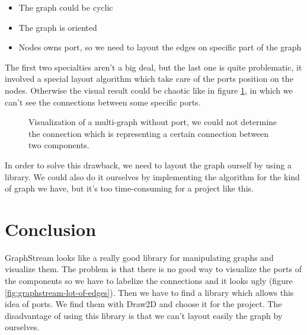 \begin{itemize}
\item The graph could be cyclic
\item The graph is oriented
\item Nodes owns port, so we need to layout the edges on specific part of the graph
\end{itemize}

The first two specialties aren't a big deal, but the last one is quite
problematic, it involved a special layout algorithm which take care of the ports
position on the nodes. Otherwise the visual result could be chaotic like in
figure \ref{fig:multigraph-no-port}, in which we can't see the connections
between some specific ports.

\begin{figure}[H]
  \centering
  \caption[Visualization of a multi-graph without port]{Visualization of a
    multi-graph without port, we could not determine the connection which is
    representing a certain connection between two components.}
  \label{fig:multigraph-no-port}
\end{figure}

In order to solve this drawback, we need to layout the graph ourself by using a
library. We could also do it ourselves by implementing the algorithm for the kind
of graph we have, but it's too time-consuming for a project like this.

\section{Conclusion}
\label{sec:viewing-library-conclusion}

GraphStream looks like a really good library for manipulating graphs and visualize
them. The problem is that there is no good way to visualize the ports of the
components so we have to labelize the connections and it looks ugly (figure
\ref{fig:graphstream-lot-of-edges}). Then we have to find a library which allows
this idea of ports. We find them with Draw2D and choose it for the project. The
disadvantage of using this library is that we can't layout easily the graph by
ourselves.

